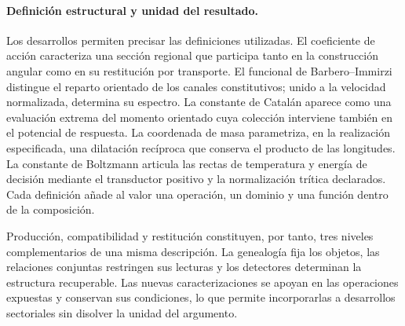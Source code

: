 \paragraph{Definición estructural y unidad del resultado.}
Los desarrollos permiten precisar las definiciones utilizadas. El
coeficiente de acción caracteriza una sección regional que participa tanto
en la construcción angular como en su restitución por transporte. El
funcional de Barbero--Immirzi distingue el reparto orientado de los canales
constitutivos; unido a la velocidad normalizada, determina su espectro.
La constante de Catalán aparece como una evaluación extrema del momento
orientado cuya colección interviene también en el potencial de respuesta.
La coordenada de masa parametriza, en la realización especificada, una
dilatación recíproca que conserva el producto de las longitudes. La
constante de Boltzmann articula las rectas de temperatura y energía de
decisión mediante el transductor positivo y la normalización trítica
declarados. Cada definición añade al valor una operación, un dominio y una
función dentro de la composición.


Producción, compatibilidad y restitución constituyen, por tanto, tres
niveles complementarios de una misma descripción. La genealogía fija
los objetos, las relaciones conjuntas restringen sus lecturas y los
detectores determinan la estructura recuperable. Las nuevas
caracterizaciones se apoyan en las operaciones expuestas y conservan
sus condiciones, lo que permite incorporarlas a desarrollos sectoriales
sin disolver la unidad del argumento.

